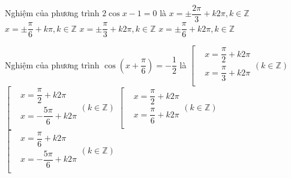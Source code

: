 \begin{ex}%
	Nghiệm của phương trình $2\cos x-1=0$  là
	\choice 
		{$x=\pm \dfrac{2\pi}{3}+k2\pi,k\in  \mathbb{Z}$}
		{$x=\pm  \dfrac{\pi}{6}+k\pi,k\in \mathbb{Z}$}
		 {\True $x=\pm \dfrac{\pi}{3}+k2\pi,k\in \mathbb{Z}$}
		{$x=\pm \dfrac{\pi}{6}+k2\pi,k\in  \mathbb{Z}$}
\end{ex}

\begin{ex}%
	Nghiệm của phương trình $\cos \left( x+\dfrac{\pi }{6} \right)=-\dfrac{1}{2}$  là
	\choice 
		{$\left[\begin{aligned}
		&  x=\dfrac{\pi }{2}+k2\pi \\
		& x=\dfrac{\pi }{3}+k2\pi \\ 
\end{aligned} \right.\left( k\in \mathbb{Z} \right)$}
{\True $\left[\begin{aligned}
& x=\dfrac{\pi  }{2}+k2\pi \\
& x=-\dfrac{5\pi }{6}+k2\pi \\ 
\end{aligned} \right.\left( k\in \mathbb{Z} \right)$}
{$\left[\begin{aligned}
& x=\dfrac{\pi }{2}+k2\pi  \\
 & x=\dfrac{\pi }{6}+k2\pi \\
\end{aligned} \right.\left( k\in \mathbb{Z} \right)$}
{$\left[\begin{aligned}
& x=\dfrac{\pi }{6}+k2\pi  \\
&  x=-\dfrac{5\pi }{6}+k2\pi \\
\end{aligned} \right.\left( k\in \mathbb{Z} \right)$}
\loigiai{ 
	Ta có $\cos \left( x+\dfrac{\pi }{6} \right)=-\dfrac{1}{2}\Leftrightarrow \left[\begin{aligned}
	& x+\dfrac{\pi }{6}=\dfrac{2\pi }{3}+k2\pi \\ 
	&  x+\dfrac{\pi }{6}=-\dfrac{2\pi }{3}+k2\pi \\
	\end{aligned} \right.\Leftrightarrow \left[\begin{aligned}
	&  x=\dfrac{\pi }{2}+k2\pi \\
	&  x=-\dfrac{5\pi }{6}+k2\pi \\
	\end{aligned} \right.\left( k\in \mathbb{Z} \right)$.
 }
\end{ex}

